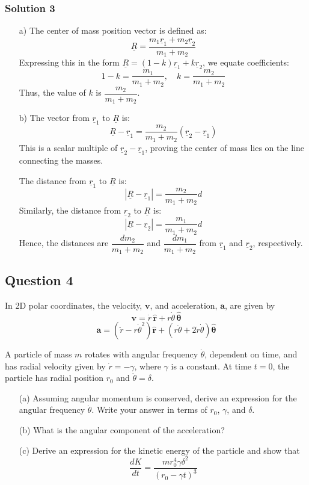 \documentclass{article}
\begin{document}
\subsubsection{Solution 3}
\begin{enumerate}
\item[a)] The center of mass position vector is defined as:
\[
\underline{R} = \frac{m_1 \underline{r}_1 + m_2 \underline{r}_2}{m_1 + m_2}
\]
Expressing this in the form \(\underline{R} = (1 - k)\underline{r}_1 + k\underline{r}_2\), we equate coefficients:
\[
1 - k = \frac{m_1}{m_1 + m_2}, \quad k = \frac{m_2}{m_1 + m_2}
\]
Thus, the value of \(k\) is \(\boxed{\dfrac{m_2}{m_1 + m_2}}\).

\item[b)] The vector from \(\underline{r}_1\) to \(\underline{R}\) is:
\[
\underline{R} - \underline{r}_1 = \frac{m_2}{m_1 + m_2}(\underline{r}_2 - \underline{r}_1)
\]
This is a scalar multiple of \(\underline{r}_2 - \underline{r}_1\), proving the center of mass lies on the line connecting the masses.

The distance from \(\underline{r}_1\) to \(\underline{R}\) is:
\[
|\underline{R} - \underline{r}_1| = \frac{m_2}{m_1 + m_2} d
\]
Similarly, the distance from \(\underline{r}_2\) to \(\underline{R}\) is:
\[
|\underline{R} - \underline{r}_2| = \frac{m_1}{m_1 + m_2} d
\]
Hence, the distances are \(\dfrac{d m_2}{m_1 + m_2}\) and \(\dfrac{d m_1}{m_1 + m_2}\) from \(\underline{r}_1\) and \(\underline{r}_2\), respectively.
\end{enumerate}

\subsection{Question 4}

In 2D polar coordinates, the velocity, \( \mathbf{v} \), and acceleration, \( \mathbf{a} \), are given by
\[
\mathbf{v} = \dot{r} \, \hat{\mathbf{r}} + r \dot{\theta} \, \hat{\boldsymbol{\theta}}
\]
\[
\mathbf{a} = \left( \ddot{r} - r \dot{\theta}^2 \right) \hat{\mathbf{r}} + \left( r \ddot{\theta} + 2 \dot{r} \dot{\theta} \right) \hat{\boldsymbol{\theta}}
\]

A particle of mass \( m \) rotates with angular frequency \( \dot{\theta} \), dependent on time, and has radial velocity given by \( \dot{r} = -\gamma \), where \( \gamma \) is a constant. At time \( t = 0 \), the particle has radial position \( r_0 \) and \( \dot{\theta} = \delta \).

\begin{itemize}
    \item[(a)] Assuming angular momentum is conserved, derive an expression for the angular frequency \( \dot{\theta} \). Write your answer in terms of \( r_0 \), \( \gamma \), and \( \delta \).
    \item[(b)] What is the angular component of the acceleration?
    \item[(c)] Derive an expression for the kinetic energy of the particle and show that
    \[
    \frac{dK}{dt} = \frac{m r_0^4 \gamma \delta^2}{(r_0 - \gamma t)^3}
    \]
\end{itemize}
\end{document}
